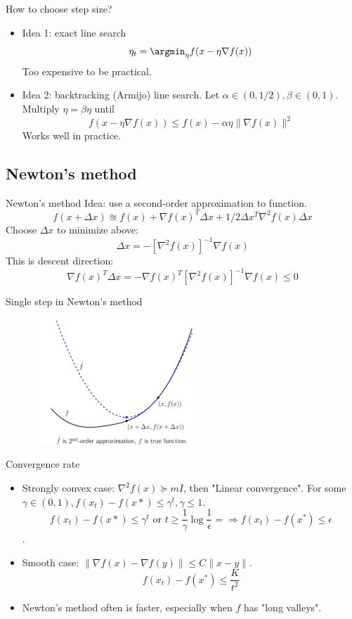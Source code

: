 \documentclass[notes]{beamer}
\begin{document}
\begin{frame}
	{How to choose step size?} 
	\begin{itemize}
		\item Idea 1: exact line search 
		\[\eta_t = \argmin_\eta f(x- \eta \nabla f(x) ) \] 
		Too expensive to be practical. 
		\item Idea 2: backtracking (Armijo) line search. Let $\alpha \in (0,1/2), \beta \in (0,1)$. Multiply $\eta = \beta \eta $ until 
		\[f(x-\eta \nabla f(x)) \le f(x) -\alpha \eta \| \nabla f(x)\|^2 \] 
		Works well in practice. 
	\end{itemize}
\end{frame}

\subsection{Newton's method} 
\begin{frame}{Newton's method} 
	Idea: use a second-order approximation to function. 
	\[f(x+\Delta x) \approxeq f(x)+\nabla f(x)^T \Delta x + 1/2 \Delta x^T \nabla^2 f(x) \Delta x \] 
	Choose $\Delta x $ to minimize above: 
	\[\Delta x = - [ \nabla^2 f(x)]^{-1} \nabla f(x) \] 
	This is descent direction: 
	\[\nabla f(x)^T \Delta x = - \nabla f(x)^T [ \nabla^2 f(x)]^{-1} \nabla f(x)  \le 0  \]
\end{frame}

\begin{frame}
	{Single step in Newton's method} 
	\begin{figure}
		\includegraphics[width=0.55\textwidth]{2018-03-05-12-44-34.png}
		\end{figure}
\end{frame}

\begin{frame}
	{Convergence rate} 
	\begin{itemize}
		\item Strongly convex case: $\nabla^2f(x) \succeq  mI $, then "Linear convergence". For some $\gamma\in (0,1), f(x_t) - f(x*) \le \gamma^t , \gamma \le 1 $. 
		\[f(x_t) - f(x*) \le \gamma^t \text{ or } t \ge \frac{1}{\gamma} \log \frac{1}{\epsilon} = \Rightarrow f(x_t ) - f(x^* ) \le \epsilon \]. 
		\item Smooth case: $\|\nabla f(x) - \nabla f(y) \| \le C \| x-y \|$. 
		\[ f(x_t) - f(x^*) \le \frac{K}{t^2} \]
		\item Newton's method often is faster, especially when $f$ has "long valleys". 
	\end{itemize}
\end{frame}
\end{document}
